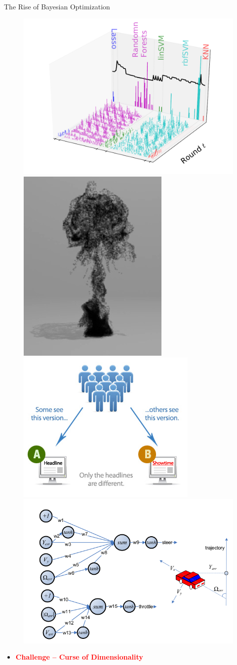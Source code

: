 \documentclass[grey]{beamer}
\begin{document}
\begin{frame}{The Rise of Bayesian Optimization}
\begin{minipage}[r]{0.48\columnwidth}
\begin{figure}[t]
      \includegraphics[width=0.9\columnwidth]{./figs/wine_arms_EI_T40} 
      \includegraphics[width=0.28\columnwidth]{./figs/animation} \\
      \includegraphics[width=0.6\columnwidth]{./figs/abtest}
      \includegraphics[width=0.6\columnwidth]{./figs/control}
     \end{figure}
    \end{minipage}
 \begin{itemize}
    \item {\bf \textcolor{red}{ Challenge -- Curse of Dimensionality}}
   \end{itemize}
 \end{frame}
\end{document}
